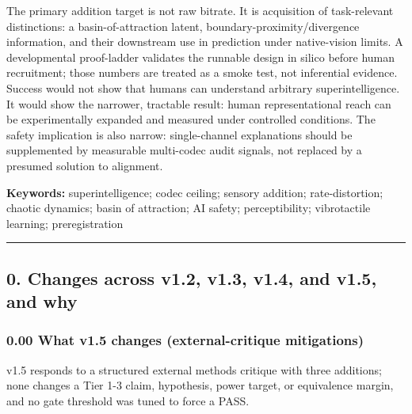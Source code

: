 \documentclass[
  11pt,
]{article}
\newcounter{none} %
\begin{document}
The primary addition target is not raw bitrate.
It is acquisition of task-relevant distinctions:
a basin-of-attraction latent,
boundary-proximity/divergence information, and
their downstream use in prediction under
native-vision limits. A developmental
proof-ladder validates the runnable design in
silico before human recruitment; those numbers
are treated as a smoke test, not inferential
evidence. Success would not show that humans can
understand arbitrary superintelligence. It would
show the narrower, tractable result: human
representational reach can be experimentally
expanded and measured under controlled
conditions. The safety implication is also
narrow: single-channel explanations should be
supplemented by measurable multi-codec audit
signals, not replaced by a presumed solution to
alignment.

\textbf{Keywords:} superintelligence; codec
ceiling; sensory addition; rate-distortion;
chaotic dynamics; basin of attraction; AI
safety; perceptibility; vibrotactile learning;
preregistration

\begin{center}\rule{0.5\linewidth}{0.5pt}\end{center}

\subsection{0. Changes across v1.2, v1.3, v1.4,
and v1.5, and
why}\label{changes-across-v1.2-v1.3-v1.4-and-v1.5-and-why}

\subsubsection{0.00 What v1.5 changes
(external-critique
mitigations)}\label{what-v1.5-changes-external-critique-mitigations}

v1.5 responds to a structured external methods
critique with three additions; none changes a
Tier 1-3 claim, hypothesis, power target, or
equivalence margin, and no gate threshold was
tuned to force a PASS.
\end{document}
